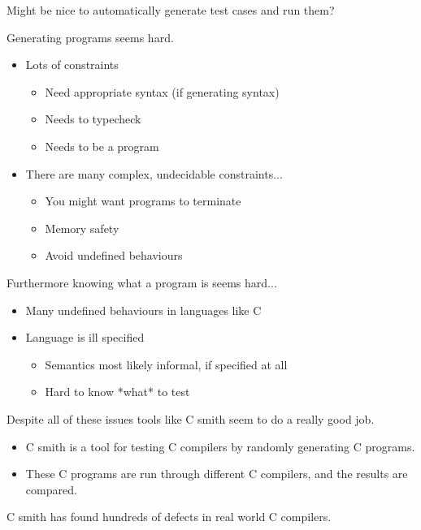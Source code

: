\documentclass{beamer}
\begin{document}
\begin{frame}
  \pause

  Might be nice to automatically generate test cases and run them?

\end{frame}

\begin{frame}

  Generating programs seems hard.

  \begin{itemize}
  \item Lots of constraints
    \begin{itemize}
    \item Need appropriate syntax (if generating syntax)
    \item Needs to typecheck
    \item Needs to be a program
    \end{itemize}
  \item There are many complex, undecidable constraints...
    \begin{itemize}
    \item You might want programs to terminate
    \item Memory safety
    \item Avoid undefined behaviours
    \end{itemize}
  \end{itemize}
\end{frame}

\begin{frame}
  Furthermore knowing what a program is seems hard...

  \begin{itemize}
  \item Many undefined behaviours in languages like C
  \item Language is ill specified
    \begin{itemize}
    \item Semantics most likely informal, if specified at all
    \item Hard to know *what* to test
    \end{itemize}
  \end{itemize}
\end{frame}

\begin{frame}

  Despite all of these issues tools like C smith seem to do a really
  good job.

  \begin{itemize}
  \item C smith is a tool for testing C compilers by randomly
    generating C programs.
  \item These C programs are run through different C compilers, and
    the results are compared.
  \end{itemize}

  C smith has found hundreds of defects in real world C compilers.
\end{frame}
\end{document}
